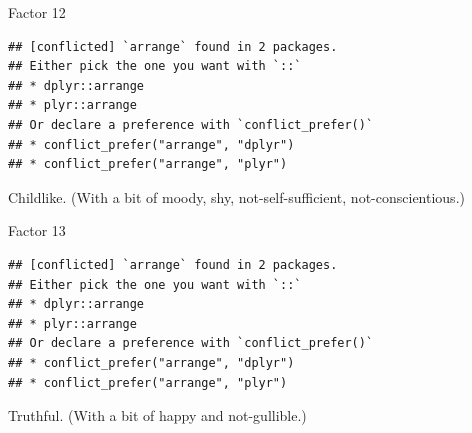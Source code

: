 \documentclass[ignorenonframetext,]{beamer}
\newenvironment{Shaded}{\begin{snugshade}}{\end{snugshade}}
\newcommand{\DecValTok}[1]{\textcolor[rgb]{0.00,0.00,0.81}{#1}}
\newcommand{\KeywordTok}[1]{\textcolor[rgb]{0.13,0.29,0.53}{\textbf{#1}}}
\newcommand{\NormalTok}[1]{#1}
\newcommand{\OperatorTok}[1]{\textcolor[rgb]{0.81,0.36,0.00}{\textbf{#1}}}
\newcommand{\StringTok}[1]{\textcolor[rgb]{0.31,0.60,0.02}{#1}}
\begin{document}
\begin{frame}[fragile]{Factor 12}
\protect\hypertarget{factor-12}{}

\begin{Shaded}
\end{Shaded}

\begin{verbatim}
## [conflicted] `arrange` found in 2 packages.
## Either pick the one you want with `::` 
## * dplyr::arrange
## * plyr::arrange
## Or declare a preference with `conflict_prefer()`
## * conflict_prefer("arrange", "dplyr")
## * conflict_prefer("arrange", "plyr")
\end{verbatim}

Childlike. (With a bit of moody, shy, not-self-sufficient,
not-conscientious.)

\end{frame}

\begin{frame}[fragile]{Factor 13}
\protect\hypertarget{factor-13}{}

\begin{Shaded}
\end{Shaded}

\begin{verbatim}
## [conflicted] `arrange` found in 2 packages.
## Either pick the one you want with `::` 
## * dplyr::arrange
## * plyr::arrange
## Or declare a preference with `conflict_prefer()`
## * conflict_prefer("arrange", "dplyr")
## * conflict_prefer("arrange", "plyr")
\end{verbatim}

Truthful. (With a bit of happy and not-gullible.)

\end{frame}
\end{document}
